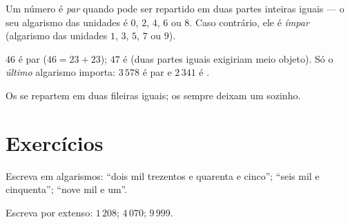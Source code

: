 \begin{definition}\label{def:g3:numbers:evenodd}
Um número é \emph{par} quando pode ser repartido em
duas partes inteiras iguais --- o seu algarismo das unidades é $0$,
$2$, $4$, $6$ ou $8$. Caso contrário, ele é
\emph{ímpar} (algarismo das unidades $1$, $3$,
$5$, $7$ ou $9$).
\end{definition}

\begin{example}
$46$ é par ($46 = 23 + 23$); $47$ é  (duas partes iguais
exigiriam meio objeto). Só o \emph{último} algarismo importa:
$3\,578$ é par e $2\,341$ é .
\end{example}

\begin{omfigure}

{\small Os  se repartem em duas fileiras iguais; os
 sempre deixam um sozinho.}
\end{omfigure}

\section{Exercícios}

\begin{exercise}[$\star$]\label{exo:g3:numbers:1}
Escreva em algarismos: ``dois mil trezentos e quarenta e cinco'';
``seis mil e cinquenta''; ``nove mil e um''.
\end{exercise}

\begin{exercise}[$\star$]\label{exo:g3:numbers:2}
Escreva por extenso: $1\,208$; \quad $4\,070$; \quad $9\,999$.
\end{exercise}

